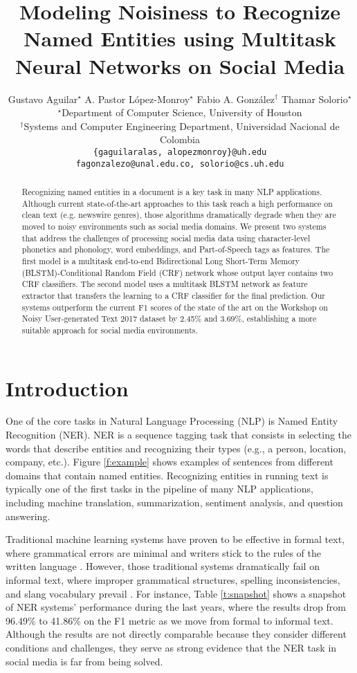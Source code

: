 \documentclass[11pt,a4paper]{article}
\title{Modeling Noisiness to Recognize Named Entities using Multitask Neural Networks on Social Media}
\author{Gustavo Aguilar$^\star$ A. Pastor L\'{o}pez-Monroy$^\star$  Fabio A. González$^\dagger$ Thamar Solorio$^\star$ \\
$^\star$Department of Computer Science, University of Houston\\
$^\dagger$Systems and Computer Engineering Department, Universidad Nacional de Colombia\\
{\tt \{gaguilaralas, alopezmonroy\}@uh.edu} \\
{\tt fagonzalezo@unal.edu.co, solorio@cs.uh.edu}
}
\date{}
\begin{document}
\maketitle

\begin{abstract}
Recognizing named entities in a document is a key task in many NLP applications. Although current state-of-the-art approaches to this task reach a high performance on clean text (e.g. newswire genres), those algorithms dramatically degrade when they are moved to noisy environments such as social media domains. We present two systems that address the challenges of processing social media data using character-level phonetics and phonology, word embeddings, and Part-of-Speech tags as features. The first model is a multitask end-to-end Bidirectional Long Short-Term Memory (BLSTM)-Conditional Random Field (CRF) network whose output layer contains two CRF classifiers. The second model uses a multitask BLSTM network as feature extractor that transfers the learning to a CRF classifier for the final prediction. Our systems outperform the current F1 scores of the state of the art on the Workshop on Noisy User-generated Text 2017 dataset by 2.45\% and 3.69\%, establishing a more suitable approach for social media environments. 
\end{abstract}


\section{Introduction}

One of the core tasks in Natural Language Processing (NLP) is Named Entity Recognition (NER). NER is a sequence tagging task that consists in selecting the words that describe entities and recognizing their types (e.g., a person, location, company, etc.).
Figure \ref{f:example} shows examples of sentences from different domains that contain named entities. Recognizing entities in running text is typically one of the first tasks in the pipeline of many NLP applications, including machine translation, summarization, sentiment analysis, and question answering. 

Traditional machine learning systems have proven to be effective in formal text, where grammatical errors are minimal and writers stick to the rules of the written language \citep{Florian:2003:NER, Chieu:2003:NER}. However, those traditional systems dramatically fail on informal text, where improper grammatical structures, spelling inconsistencies, and slang vocabulary prevail \citep{Ritter:2011:NER:2145432.2145595}. For instance, Table \ref{t:snapshot} shows a snapshot of NER systems' performance during the last years, where the results drop from 96.49\% to 41.86\% on the F1 metric as we move from formal to informal text. Although the results are not directly comparable because they consider different conditions and challenges, they serve as strong evidence that the NER task in social media is far from being solved.
\end{document}
